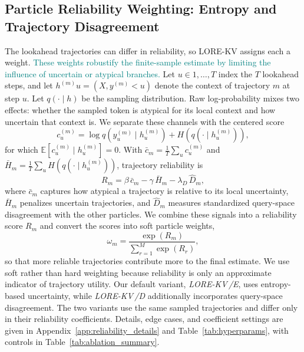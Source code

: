 \documentclass{article} %
\newcommand{\lorekvE}{LORE-KV\,/E}
\newcommand{\lorekvD}{LORE-KV\,/D}
\begin{document}
\subsection{Particle Reliability Weighting: Entropy and Trajectory Disagreement} \label{subsec:confidence}
The lookahead trajectories can differ in reliability, so LORE-KV assigns each a weight. \textcolor{teal}{These weights robustify the finite-sample estimate by limiting the influence of uncertain or atypical branches.} Let $u\in{1,\ldots,T}$ index the $T$ lookahead steps, and let $h^{(m)}u=(X,y^{(m)}{<u})$ denote the context of trajectory $m$ at step $u$. Let $q(\cdot\mid h)$ be the sampling distribution. Raw log-probability mixes two effects: whether the sampled token is atypical for its local context and how uncertain that context is. We separate these channels with the centered score
\begin{equation}
 c^{(m)}_u
 =\log q\!\left(y^{(m)}_u\mid h^{(m)}_u\right)
 +H\!\left(q(\cdot\mid h^{(m)}_u)\right),
 \label{eq:centered_score}
\end{equation}
for which $\mathbb{E}[c^{(m)}_u\mid h^{(m)}_u]=0$. With $\bar c_m=\tfrac1T\sum_u c^{(m)}_u$ and $\bar H_m=\tfrac1T\sum_u H(q(\cdot\mid h^{(m)}_u))$, trajectory reliability is
\begin{equation}
 R_m=\beta\,\bar c_m-\gamma\,\bar H_m-\lambda_D\,\hat D_m,
 \label{eq:confidence}
\end{equation}
where $\bar c_m$ captures how atypical a trajectory is relative to its local uncertainty, $\bar H_m$ penalizes uncertain trajectories, and $\hat D_m$ measures standardized query-space disagreement with the other particles. We combine these signals into a reliability score $R_m$ and convert the scores into soft particle weights,
\begin{equation}
\omega_m
= \frac{\exp(R_m)}
{\sum_{r=1}^{M}\exp(R_r)},
\label{eq:particle_weight}
\end{equation}
so that more reliable trajectories contribute more to the final estimate. We use soft rather than hard weighting because reliability is only an approximate indicator of trajectory utility. Our default variant, \emph{\lorekvE}, uses entropy-based uncertainty, while \emph{\lorekvD} additionally incorporates query-space disagreement. The two variants use the same sampled trajectories and differ only in their reliability coefficients. Details, edge cases, and coefficient settings are given in Appendix~\ref{app:reliability_details} and Table~\ref{tab:hyperparams}, with controls in Table~\ref{tab:ablation_summary}.
\end{document}
